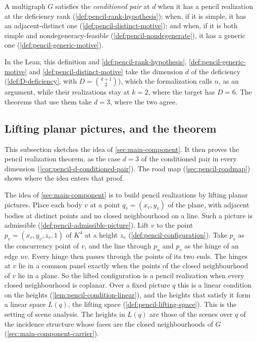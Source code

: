 \begin{definition}
  \label{def:pencil-conditioned-pair}
  \leanok
  A multigraph $G$ satisfies the \emph{conditioned pair} at $d$ when it
  has a pencil realization at the deficiency rank
  (\cref{def:pencil-rank-hypothesis}); when, if it is simple, it has an
  adjacent-distinct one (\cref{def:pencil-distinct-motive}); and when, if
  it is both simple and nondegeneracy-feasible
  (\cref{def:pencil-nondegenerate}), it has a generic one
  (\cref{def:pencil-generic-motive}).
\end{definition}
\begin{fmlnote}
  \label{fmlnote:pencil-conditioned-pair}
  In the Lean, this definition and \cref{def:pencil-rank-hypothesis},
  \cref{def:pencil-generic-motive} and \cref{def:pencil-distinct-motive}
  take the dimension $d$ of the deficiency (\cref{def:D-deficiency}, with
  $D = \binom{d+1}{2}$), which the formalization calls $n$, as an
  argument, while their realizations stay at $k = 2$, where the target has
  $D = 6$. The theorems that use them take $d = 3$, where the two agree.
\end{fmlnote}

\subsection{Lifting planar pictures, and the theorem}
\label{sec:pencil-main-component-route}

This subsection sketches the idea of \cref{sec:main-component}. It then
proves the pencil realization theorem, as the case $d = 3$ of the
conditioned pair in every dimension
(\cref{cor:pencil-d-conditioned-pair}). The road map
(\cref{sec:pencil-roadmap}) shows where the idea enters that proof.

The idea of \cref{sec:main-component} is to build pencil realizations
by lifting planar pictures.
Place each body $v$ at a point $q_v = (x_v, y_v)$ of the plane, with
adjacent bodies at distinct points and no closed neighbourhood on a
line. Such a picture is admissible (\cref{def:pencil-admissible-picture}).
Lift $v$ to the point $p_v = (x_v, y_v, z_v, 1)$ of $K^4$ at a height
$z_v$ (\cref{def:pencil-configuration}). Take $p_v$ as the concurrency
point of $v$, and the line through $p_u$ and $p_v$ as the hinge of an
edge $uv$. Every hinge then passes through the points of its two ends.
The hinges at $v$ lie in a common panel exactly when the points of the
closed neighbourhood of $v$ lie in a plane. So the lifted configuration
is a pencil realization when every closed neighbourhood is coplanar.
Over a fixed picture $q$ this is a linear condition on the heights
(\cref{lem:pencil-condition-linear}), and the heights that satisfy it
form a linear space $L(q)$, the lifting space
(\cref{def:pencil-lifting-space}). This is the setting of scene
analysis. The heights in $L(q)$ are those of the scenes over $q$ of the
incidence structure whose faces are the closed neighbourhoods of $G$
(\cref{sec:main-component-carrier}).

